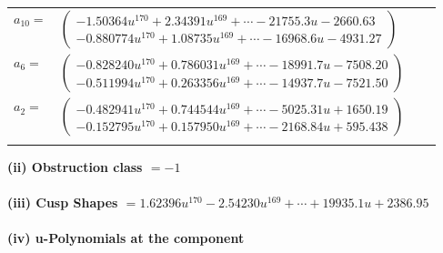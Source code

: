 \documentclass[1p]{elsarticle_modified}
\theoremstyle{definition}
\begin{document}
\begin{tabular}{m{7pt} m{180pt} m{7pt} m{180pt} }
\flushright $a_{10}=$&$\begin{pmatrix}-1.50364 u^{170}+2.34391 u^{169}+\cdots-21755.3 u-2660.63\\-0.880774 u^{170}+1.08735 u^{169}+\cdots-16968.6 u-4931.27\end{pmatrix}$ \\
\flushright $a_{6}=$&$\begin{pmatrix}-0.828240 u^{170}+0.786031 u^{169}+\cdots-18991.7 u-7508.20\\-0.511994 u^{170}+0.263356 u^{169}+\cdots-14937.7 u-7521.50\end{pmatrix}$ \\
\flushright $a_{2}=$&$\begin{pmatrix}-0.482941 u^{170}+0.744544 u^{169}+\cdots-5025.31 u+1650.19\\-0.152795 u^{170}+0.157950 u^{169}+\cdots-2168.84 u+595.438\end{pmatrix}$\\&\end{tabular}
\flushleft \textbf{(ii) Obstruction class $= -1$}\\~\\
\flushleft \textbf{(iii) Cusp Shapes $= 1.62396 u^{170}-2.54230 u^{169}+\cdots+19935.1 u+2386.95$}\\~\\
\newpage\renewcommand{\arraystretch}{1}
\flushleft \textbf{(iv) u-Polynomials at the component}\newline \\
\end{document}
